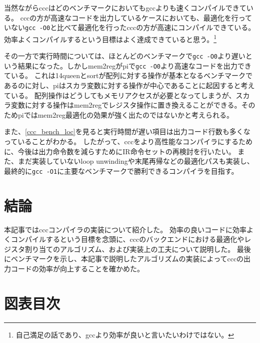 \documentclass[uplatex,a4paper]{jsarticle}
\begin{document}
当然ながらcccはどのベンチマークにおいてもgccよりも速くコンパイルできている。
cccの方が高速なコードを出力しているケースにおいても、最適化を行っていない\texttt{gcc -O0}と比べて最適化を行ったcccの方が高速にコンパイルできている。
効率よくコンパイルするという目標はよく達成できていると思う。\footnote{自己満足の話であり、gccより効率が良いと言いたいわけではない。}

その一方で実行時間については、ほとんどのベンチマークで\texttt{gcc -O0}より遅いという結果になった。しかしmem2regがpiで\texttt{gcc -O0}より高速なコードを出力できている。
これは14queenとsortが配列に対する操作が基本となるベンチマークであるのに対し、piはスカラ変数に対する操作が中心であることに起因すると考えている。
配列操作はどうしてもメモリアクセスが必要となってしまうが、スカラ変数に対する操作はmem2regでレジスタ操作に置き換えることができる。そのためpiではmem2reg最適化の効果が強く出たのではないかと考えられる。

また、\cref{ccc_bench_loc}を見ると実行時間が遅い項目は出力コード行数も多くなっていることがわかる。
したがって、cccをより高性能なコンパイラにするために、今後は出力命令数を減らすためにIR命令セットの再検討を行いたい。
また、まだ実装していないloop unwindingや末尾再帰などの最適化パスも実装し、最終的に\texttt{gcc -O1}に主要なベンチマークで勝利できるコンパイラを目指す。

\section{結論}

本記事ではcccコンパイラの実装について紹介した。
効率の良いコードに効率よくコンパイルするという目標を念頭に、cccのバックエンドにおける最適化やレジスタ割り当てのアルゴリズム、および実装上の工夫について説明した。
最後にベンチマークを示し、本記事で説明したアルゴリズムの実装によってcccの出力コードの効率が向上することを確かめた。

\clearpage
\appendix

\section{図表目次}
\listoffigures
\listofalgorithms
\listoftables



\end{document}
